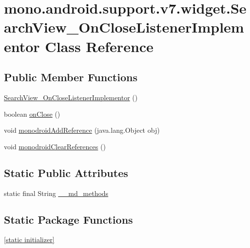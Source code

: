 \hypertarget{classmono_1_1android_1_1support_1_1v7_1_1widget_1_1_search_view___on_close_listener_implementor}{
\section{mono.android.support.v7.widget.SearchView\_\-OnCloseListenerImplementor Class Reference}
\label{classmono_1_1android_1_1support_1_1v7_1_1widget_1_1_search_view___on_close_listener_implementor}
}
\subsection*{Public Member Functions}
\begin{CompactItemize}
\item 
\hyperlink{classmono_1_1android_1_1support_1_1v7_1_1widget_1_1_search_view___on_close_listener_implementor_82fcbbdc5f5b9e1826f5bec91c7264cb}{SearchView\_\-OnCloseListenerImplementor} ()
\item 
boolean \hyperlink{classmono_1_1android_1_1support_1_1v7_1_1widget_1_1_search_view___on_close_listener_implementor_5f434ffc99aab8b87c5cb0e0fbdde7bc}{onClose} ()
\item 
void \hyperlink{classmono_1_1android_1_1support_1_1v7_1_1widget_1_1_search_view___on_close_listener_implementor_5622e5a877333e34785ae8e8343ee55f}{monodroidAddReference} (java.lang.Object obj)
\item 
void \hyperlink{classmono_1_1android_1_1support_1_1v7_1_1widget_1_1_search_view___on_close_listener_implementor_0b4a5624059750f110ead6d67deaad28}{monodroidClearReferences} ()
\end{CompactItemize}
\subsection*{Static Public Attributes}
\begin{CompactItemize}
\item 
static final String \hyperlink{classmono_1_1android_1_1support_1_1v7_1_1widget_1_1_search_view___on_close_listener_implementor_de24b40287e42469422f6653a871f026}{\_\-\_\-md\_\-methods}
\end{CompactItemize}
\subsection*{Static Package Functions}
\begin{CompactItemize}
\item 
\hyperlink{classmono_1_1android_1_1support_1_1v7_1_1widget_1_1_search_view___on_close_listener_implementor_50c26bed78a47e7c842e4e0be9dddeb8}{\mbox{[}static initializer\mbox{]}}
\end{CompactItemize}

